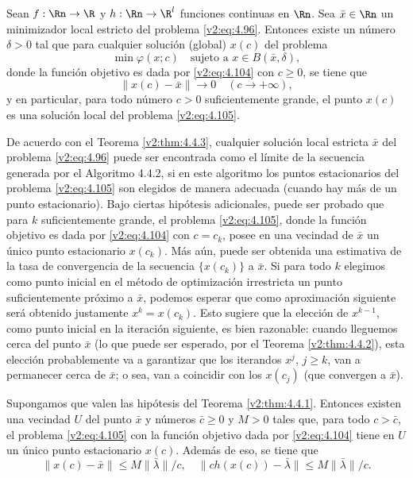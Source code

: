 \begin{theorem}\label{v2:thm:4.4.3}
    Sean $f: \Rn \to \R$ y $h: \Rn \to \R^l$ funciones continuas en $\Rn$. Sea $\bar{x} \in \Rn$ un minimizador local estricto del problema \eqref{v2:eq:4.96}.
    Entonces existe un número $\delta > 0$ tal que para cualquier solución (global) $x(c)$ del problema
    \[
        \min \varphi(x; c) \quad \text{sujeto a } x \in B(\bar{x}, \delta),
    \]
    donde la función objetivo es dada por \eqref{v2:eq:4.104} con $c \ge 0$, se tiene que
    \begin{equation}
        \|x(c) - \bar{x}\| \to 0 \quad (c \to +\infty),
        \label{v2:eq:4.109}
    \end{equation}
    y en particular, para todo número $c > 0$ suficientemente grande, el punto $x(c)$ es una solución local del problema \eqref{v2:eq:4.105}.
\end{theorem}

De acuerdo con el Teorema \ref{v2:thm:4.4.3}, cualquier solución local estricta $\bar{x}$ del problema \eqref{v2:eq:4.96} puede ser encontrada como el límite de la secuencia generada por el Algoritmo 4.4.2, si en este algoritmo los puntos estacionarios del problema \eqref{v2:eq:4.105} son elegidos de manera adecuada (cuando hay más de un punto estacionario). Bajo ciertas hipótesis adicionales, puede ser probado que para $k$ suficientemente grande, el problema \eqref{v2:eq:4.105}, donde la función objetivo es dada por \eqref{v2:eq:4.104} con $c = c_k$, posee en una vecindad de $\bar{x}$ un único punto estacionario $x(c_k)$. Más aún, puede ser obtenida una estimativa de la tasa de convergencia de la secuencia $\{x(c_k)\}$ a $\bar{x}$. Si para todo $k$ elegimos como punto inicial en el método de optimización irrestricta un punto suficientemente próximo a $\bar{x}$, podemos esperar que como aproximación siguiente será obtenido justamente $x^k = x(c_k)$. Esto sugiere que la elección de $x^{k-1}$, como punto inicial en la iteración siguiente, es bien razonable: cuando lleguemos cerca del punto $\bar{x}$ (lo que puede ser esperado, por el Teorema \ref{v2:thm:4.4.2}), esta elección probablemente va a garantizar que los iterandos $x^j$, $j \ge k$, van a permanecer cerca de $\bar{x}$; o sea, van a coincidir con los $x(c_j)$ (que convergen a $\bar{x}$).

\begin{theorem}\label{v2:thm:4.4.4}
    Supongamos que valen las hipótesis del Teorema \ref{v2:thm:4.4.1}.
    Entonces existen una vecindad $U$ del punto $\bar{x}$ y números $\bar{c} \ge 0$ y $M > 0$ tales que, para todo $c > \bar{c}$, el problema \eqref{v2:eq:4.105} con la función objetivo dada por \eqref{v2:eq:4.104} tiene en $U$ un único punto estacionario $x(c)$. Además de eso, se tiene que
    \begin{equation}
        \|x(c) - \bar{x}\| \le M \|\bar{\lambda}\|/c, \quad \|c h(x(c)) - \bar{\lambda}\| \le M \|\bar{\lambda}\|/c.
        \label{v2:eq:4.110}
    \end{equation}
\end{theorem}

